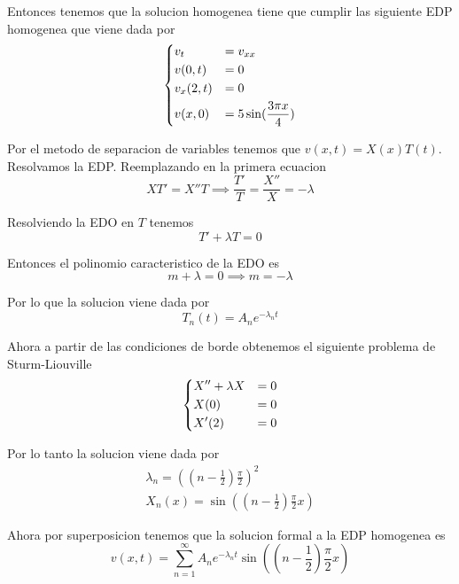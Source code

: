 \message{ !name(MAT024.tex)}\documentclass[../main.tex]{subfiles}
\begin{document}
\begin{solution}
  Entonces tenemos que la solucion homogenea tiene que cumplir las siguiente EDP homogenea que viene dada por
  \begin{equation*}
    \begin{dcases}
      v_{t} &= v_{xx}\\
      v(0, t) &= 0\\
      v_{x}(2, t) &= 0\\
      v(x, 0) &= 5 \sin(\frac{3\pi x}{4})
    \end{dcases}
  \end{equation*}

  Por el metodo de separacion de variables tenemos que $v(x, t) = X(x)T(t)$. Resolvamos la EDP.
  Reemplazando en la primera ecuacion
  \begin{equation*}
    XT' = X''T \implies \frac{T'}{T} = \frac{X''}{X} = -\lambda
  \end{equation*}

  Resolviendo la EDO en $T$ tenemos
  \begin{equation*}
    T' + \lambda T = 0
  \end{equation*}

  Entonces el polinomio caracteristico de la EDO es
  \begin{equation*}
    m + \lambda = 0 \implies m = - \lambda
  \end{equation*}

  Por lo que la solucion viene dada por
  \begin{equation*}
    T_{n}(t) = A_{n}e^{-\lambda_{n} t}
  \end{equation*}

  Ahora a partir de las condiciones de borde obtenemos el siguiente problema de Sturm-Liouville
  \begin{equation*}
    \begin{dcases}
     X'' + \lambda X &= 0\\
     X(0) &= 0\\
     X'(2) &= 0
    \end{dcases}
  \end{equation*}

  Por lo tanto la solucion viene dada por
  \begin{gather*}
    \lambda_{n} = ((n - \frac{1}{2}) \frac{\pi}{2})^{2}\\
    X_{n}(x) = \sin((n - \frac12) \frac{\pi}{2} x)
  \end{gather*}

  Ahora por superposicion tenemos que la solucion formal a la EDP homogenea es
  \begin{equation*}
    v(x, t) = \sum_{n = 1}^{\infty} A_{n}e^{-\lambda_{n} t}\sin((n - \frac12) \frac{\pi}{2}x)
  \end{equation*}


\end{solution}
\end{document}
